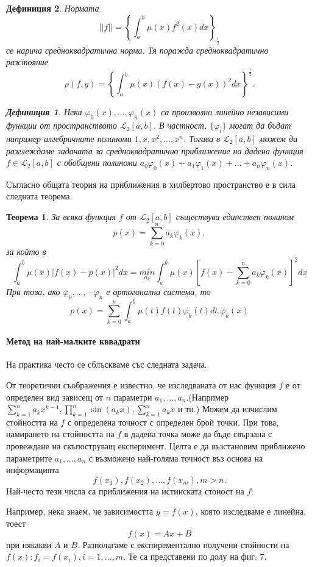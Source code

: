 \documentclass[12pt]{article}
\numberwithin{equation}{section}
\newtheorem{theorem}{Теорема}
\newtheorem{definition}{Дефиниция}
\numberwithin{theorem}{section}
\numberwithin{definition}{section}
\numberwithin{corollary}{section}
\begin{document}
\begin{definition}
Нормата
\[
||f|| = \left\{\int_a^b\mu(x)f^2(x)dx\right\}_\frac{1}{2}
\]
се нарича средноквадратична норма. Тя поражда средноквадратично разстояние
\[
\rho(f,g) = \left\{\int_a^b\mu(x)(f(x)-g(x))^2dx\right\}^\frac{1}{2}.
\]
\begin{definition}
Нека $\varphi_0(x),\dotso, \varphi_n(x)$ са произволно линейно независими функции от пространството $\mathcal{L}_2[a,b]$. В частност, $\{\varphi_i\}$ могат да бъдат например алгебричните полиноми $1, x, x^2, \dotso, x^n$. Тогава в $\mathcal{L}_2[a,b]$ можем да разглеждаме задачата за средноквадратично приближение на дадена функция $f\in\mathcal{L}_2[a,b]$ с обобщени полиноми $a_0\varphi_0(x)+a_1\varphi_1(x)+\dotso + a_n\varphi_n(x)$.
\end{definition}
\end{definition}
Съгласно общата теория на приближения в хилбертово пространство е в сила следната теорема.
\begin{theorem}\label{T3.1}
За всяка функция $f$ от $\mathcal{L}_2[a,b]$ съществува единствен полином 
\[
p(x) = \displaystyle\sum_{k=0}^na_k\varphi_k(x),
\]
за който в 
\[
\int_a^b\mu(x)|f(x)-p(x)|^2dx = \underset{a_k}{min}\int_a^b\mu(x)
                                \left[f(x) - \displaystyle\sum_{k=0}^na_k\varphi_k(x)\right]^2dx
\]
При това, ако $\varphi_0,\dotso,-\varphi_n$ е ортогонална система, то
\begin{equation}\label{e3.2}
p(x) = \displaystyle\sum_{k=0}^n\int_a^b\mu(t)f(t)\varphi_k(t)dt.\varphi_k(x)
\end{equation}
\end{theorem}
\paragraph{Метод на най-малките кввадрати}
\par
На практика често се сблъскваме със следната задача.
\par
От теоретични съображения е известно, че изследваната от нас функция $f$ е от определен вид зависещ от $n $ параметри $a_1,\dotso,a_n$.(Например $\displaystyle\sum_{k=1}^na_kx^{k-1}, \displaystyle\prod_{k=1}^n\sin(a_kx),\displaystyle\sum_{k=1}^na_kx$ и тн.) Можем да изчислим стойността на $f$ с определена точност с определен брой точки. При това, намирането на стойността на $f$ в дадена точка може да бъде свързана с провеждане на скъпоструващ експеримент. Целта е да възстановим приближено параметрите $a_1, \dotso, a_n$ с възможено най-голяма точност въз основа на информацията
\[
f(x_1),f(x_2),\dotso,f(x_m), m>n.
\]
Най-често тези числа са приближения на истинската стоност на $f$.
\par
Например, нека знаем, че зависимостта $y=f(x)$, която изследваме е линейна, тоест
\[
f(x) = Ax+B
\]
при някакви $A$ и $B$. Разполагаме с експирементално получени стойности на $f(x):f_i = f(x_i), i = 1,\dotso,m$. Те са представени по долу на фиг. 7.
\end{document}
